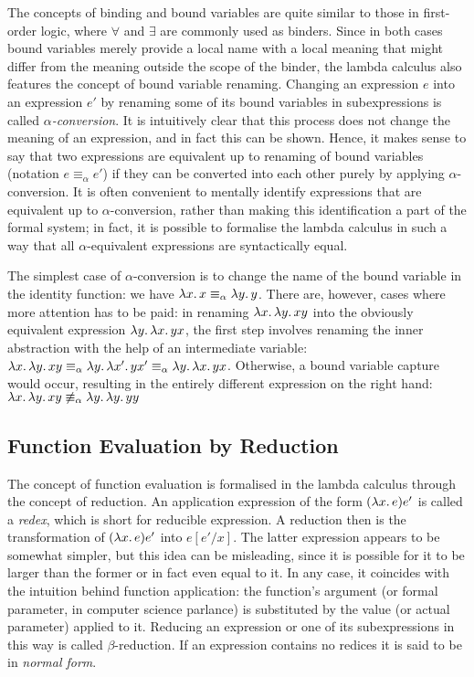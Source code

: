 The concepts of binding and  bound variables are quite similar to those in
first-order logic, where $\forall$ and $\exists$ are commonly used as binders. Since in both
cases bound variables merely provide a local name with a local meaning that
might differ from the meaning outside the scope of the binder, the lambda
calculus also features the concept of bound variable renaming. Changing an
expression $e$ into an expression $e'$ by renaming some of its bound variables
in subexpressions is called \emph{$\alpha$-conversion}. It is intuitively clear that
this process does not change the meaning of an expression, and in fact this can
be shown. Hence, it makes sense to say that two expressions are equivalent up to
renaming of bound variables
(notation $e \equiv_\alpha e'$) if they can be converted into each other purely by applying
$\alpha$-conversion. It is often convenient to mentally identify expressions
that are equivalent up to $\alpha$-conversion, rather than making this
identification a part of the formal system; in fact, it is possible to formalise
the lambda calculus in such a way that all $\alpha$-equivalent expressions are
syntactically equal.
\begin{expl}
The simplest case of $\alpha$-conversion is to change the name of the bound variable
in the identity function: we have ${\lambda x.\,x} \equiv_\alpha
{\lambda y.\,y}$. There are, however, cases where more attention has to be
paid: in renaming ${\lambda x.\,{\lambda y.\,x y}}$ into the obviously
equivalent expression ${\lambda y.\,{\lambda x.\,y x}}$, the first step
involves renaming the inner abstraction with the help of an intermediate
variable: ${\lambda x.\,{\lambda y.\,x y}} \equiv_\alpha
{\lambda y.\,{\lambda x'.\,y x'}} \equiv_\alpha {\lambda y.\,{\lambda x.\,y
    x}}$. Otherwise, a bound variable capture would occur, resulting in the
entirely different expression on the right hand: 
${\lambda x.\,{\lambda y.\,x y}} \not\equiv_\alpha {\lambda y.\,{\lambda y.\,y y}}$
\end{expl}


\subsection{Function Evaluation by Reduction}
\label{sec:function-evaluation}
The concept of function evaluation is formalised in the lambda calculus through
the concept of reduction. An application expression of the form
$({\lambda x.\,e}) e'$ is called a \emph{redex}, which is short for reducible
expression. A reduction then is the transformation of $({\lambda x.\,e}) e'$
into $e[e'/x]$. The latter expression appears to be somewhat simpler, but this
idea can be misleading, since it is possible for it to be larger than the former
or in fact even equal to it. In any case, it coincides with the intuition behind
function application: the function's argument (or formal parameter, in computer
science parlance) is substituted by the value (or actual parameter) applied to
it. Reducing an expression or one of its subexpressions in this way is called
$\beta$-reduction. If an expression contains no redices it is said to be in
\emph{normal form}.

